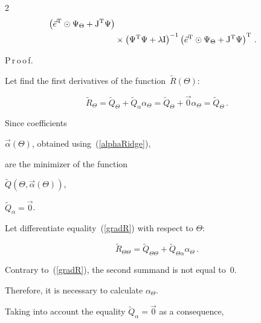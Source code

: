 \begin{multicols}{2}
\begin{align}
      \left({\vec e}^{\mathrm{T}} \odot \Psi_\Theta + \mathrm{J}^{\mathrm{T}}  \Psi\right)\notag\\

      &{}\times  \left( \Psi^{\mathrm{T}} \Psi  + \lambda \mathrm{I} \right)^{-1}

      \left({\vec e}^{\mathrm{T}} \odot \Psi_\Theta + \mathrm{J}^{\mathrm{T}}  

      \Psi\right)^{\mathrm{T}}\,.    \label{rHessBeforeNls}

  \end{align}



\noindent

P\,r\,o\,o\,f.\ \ 

Let find the first derivatives of the function~$\widetilde R\left( \Theta \right)$:

  \begin{equation}

    \label{gradR}

    \widetilde R_\Theta = \widetilde Q_\Theta + \widetilde Q_\alpha \alpha_\Theta = \widetilde Q_\Theta + \vec0 \alpha_\Theta = \widetilde Q_\Theta\,.

  \end{equation}

   Since coefficients 

  $\vec\alpha \left( \Theta \right)$, obtained using~(\ref{alphaRidge}), 

  are the minimizer of the function

 $\widetilde Q\left( \Theta, \vec \alpha\left(\Theta\right) \right)$,

 $\widetilde Q_\alpha = \vec 0$.

  Let  differentiate equality~(\ref{gradR}) with respect to $\Theta$:

  \begin{equation}

    \label{HessianR}

    \widetilde R_{\Theta\Theta} = \widetilde Q_{\Theta\Theta} + \widetilde Q_{\Theta\alpha} \alpha_\Theta\,.

  \end{equation}



Contrary to~(\ref{gradR}), the second summand is not equal to~0. 

Therefore, it is necessary to calculate $\alpha_\Theta$.

Taking into account the equality $\widetilde Q_\alpha = \vec 0$ as a consequence, 


\end{multicols}
